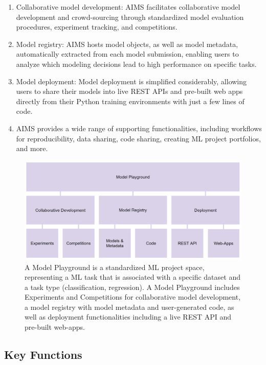 \begin{enumerate}
    \item Collaborative model development: AIMS facilitates collaborative model development and crowd-sourcing through standardized model evaluation procedures, experiment tracking, and competitions. 
    \item Model registry: AIMS hosts model objects, as well as model metadata, automatically extracted from each model submission, enabling users to analyze which modeling decisions lead to high performance on specific tasks.
    \item Model deployment: Model deployment is simplified considerably, allowing users to share their models into live REST APIs and pre-built web apps directly from their Python training environments with just a few lines of code.
    \item AIMS provides a wide range of supporting functionalities, including workflows for reproducibility, data sharing, code sharing, creating ML project portfolios, and more.
\end{enumerate}


\begin{figure}
  \centering
  \includegraphics[width=1\textwidth]{figures/fig_overview.png}
  \caption{A Model Playground is a standardized ML project space, representing a ML task that is associated with a specific dataset and a task type (classification, regression). A Model Playground includes Experiments and Competitions for collaborative model development, a model registry with model metadata and user-generated code, as well as deployment functionalities including a live REST API and pre-built web-apps.}
  \label{fig:fig_overview}
\end{figure}


\subsection{Key Functions}
